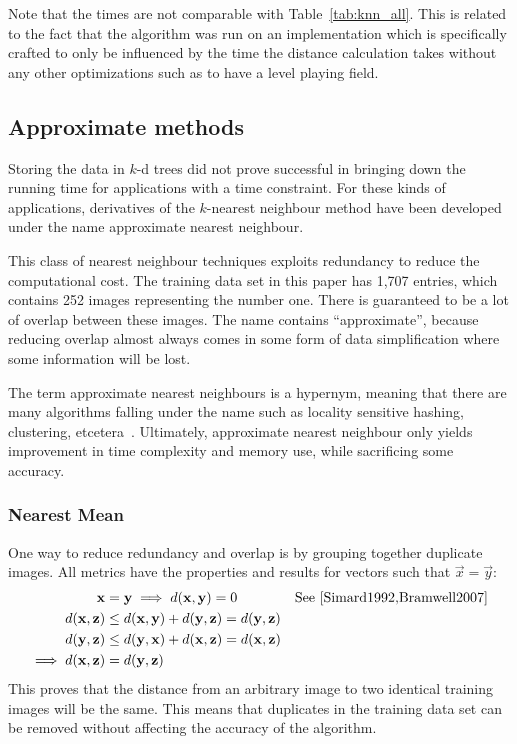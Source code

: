 Note that the times are not comparable with Table~\ref{tab:knn_all}.
This is related to the fact that the algorithm was run on an implementation which is specifically crafted to only be influenced by the time the distance calculation takes without any other optimizations such as to have a level playing field.

\subsection{Approximate methods}\label{s:knn:approximate}
Storing the data in \(k\)-d trees did not prove successful in bringing down the running time for applications with a time constraint.
For these kinds of applications, derivatives of the \(k\)-nearest neighbour method have been developed under the name approximate nearest neighbour.

This class of nearest neighbour techniques exploits redundancy to reduce the computational cost.
The training data set in this paper has 1,707 entries, which contains 252 images representing the number one.
There is guaranteed to be a lot of overlap between these images.
The name contains ``approximate'', because reducing overlap almost always comes in some form of data simplification where some information will be lost.

The term approximate nearest neighbours is a hypernym, meaning that there are many algorithms falling under the name such as locality sensitive hashing, clustering, etcetera~\cite{Rajaraman2011, Bhatia2010}.
Ultimately, approximate nearest neighbour only yields improvement in time complexity and memory use, while sacrificing some accuracy.

\subsubsection{Nearest Mean}
One way to reduce redundancy and overlap is by grouping together duplicate images. All metrics have the properties and results for vectors such that \(\vec{x} = \vec{y}\):
\begin{align*}
    \vec{x}                      & = \vec{y} \implies d(\vec{x}, \vec{y}) = 0                           & \text{See~\cite{Simard1992,Bramwell2007}} \\
    d(\vec{x}, \vec{z})          & \leq d(\vec{x}, \vec{y}) + d(\vec{y}, \vec{z}) = d(\vec{y}, \vec{z})                                             \\
    d(\vec{y}, \vec{z})          & \leq d(\vec{y}, \vec{x}) + d(\vec{x}, \vec{z}) = d(\vec{x}, \vec{z})                                             \\
    \implies d(\vec{x}, \vec{z}) & = d(\vec{y}, \vec{z})
\end{align*}
This proves that the distance from an arbitrary image to two identical training images will be the same.
This means that duplicates in the training data set can be removed without affecting the accuracy of the algorithm.


